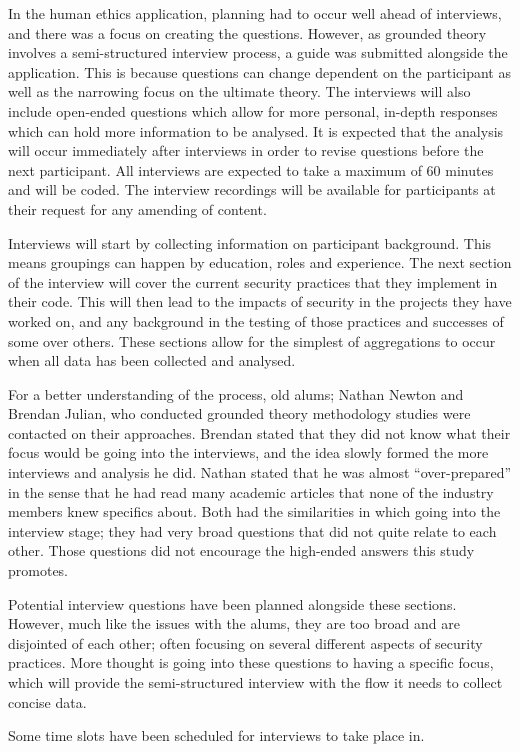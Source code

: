 \par In the human ethics application, planning had to occur well ahead of interviews, and there was a focus on creating the questions. However, as grounded theory involves a semi-structured interview process, a guide was submitted alongside the application. This is because questions can change dependent on the participant as well as the narrowing focus on the ultimate theory. The interviews will also include open-ended questions which allow for more personal, in-depth responses which can hold more information to be analysed. It is expected that the analysis will occur immediately after interviews in order to revise questions before the next participant.  All interviews are expected to take a maximum of 60 minutes and will be coded. The interview recordings will be available for participants at their request for any amending of content.
\newline
\par Interviews will start by collecting information on participant background. This means groupings can happen by education, roles and experience. The next section of the interview will cover the current security practices that they implement in their code. This will then lead to the impacts of security in the projects they have worked on, and any background in the testing of those practices and successes of some over others. These sections allow for the simplest of aggregations to occur when all data has been collected and analysed. 
\newline
\par For a better understanding of the process, old alums; Nathan Newton and Brendan Julian, who conducted grounded theory methodology studies were contacted on their approaches. Brendan stated that they did not know what their focus would be going into the interviews, and the idea slowly formed the more interviews and analysis he did. Nathan stated that he was almost “over-prepared” in the sense that he had read many academic articles that none of the industry members knew specifics about. Both had the similarities in which going into the interview stage; they had very broad questions that did not quite relate to each other. Those questions did not encourage the high-ended answers this study promotes. 
\newline
\par Potential interview questions have been planned alongside these sections. However, much like the issues with the alums, they are too broad and are disjointed of each other; often focusing on several different aspects of security practices. More thought is going into these questions to having a specific focus, which will provide the semi-structured interview with the flow it needs to collect concise data.
\newline
\par Some time slots have been scheduled for interviews to take place in.


